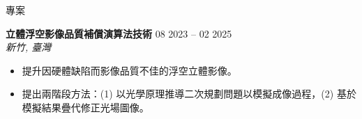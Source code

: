 \documentclass{resume}
\begin{document}
\begin{rSection}{專案}
    \item \textbf{立體浮空影像品質補償演算法技術} \hfill {08 2023 -- 02 2025}\\
    \mbox{} \hfill \textit{新竹, 臺灣}
    \vspace{-0.5em}
    \begin{itemize}
        \item 提升因硬體缺陷而影像品質不佳的浮空立體影像。
        \item 提出兩階段方法：(1) 以光學原理推導二次規劃問題以模擬成像過程，(2) 基於模擬結果疊代修正光場圖像。
    \end{itemize}
\end{rSection} 





\end{document}
